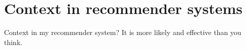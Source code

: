 \section{Context in recommender systems}
Context in my recommender system? It is more likely and effective than you think.

